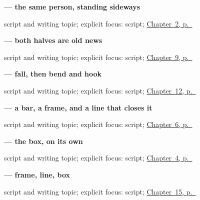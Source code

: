 \noindent\begin{minipage}[t]{\linewidth}
\raggedright
\textbf{ — the same person, standing sideways}\par
\footnotesize script and writing topic; explicit focus: script; \hyperref[ch:zh-components]{Chapter~2, p.~\pageref*{ch:zh-components}}
\end{minipage}\par\smallskip

\noindent\begin{minipage}[t]{\linewidth}
\raggedright
\textbf{ — both halves are old news}\par
\footnotesize script and writing topic; explicit focus: script; \hyperref[ch:zh-shenme]{Chapter~9, p.~\pageref*{ch:zh-shenme}}
\end{minipage}\par\smallskip

\noindent\begin{minipage}[t]{\linewidth}
\raggedright
\textbf{ — fall, then bend and hook}\par
\footnotesize script and writing topic; explicit focus: script; \hyperref[ch:zh-family-six]{Chapter~12, p.~\pageref*{ch:zh-family-six}}
\end{minipage}\par\smallskip

\noindent\begin{minipage}[t]{\linewidth}
\raggedright
\textbf{ — a bar, a frame, and a line that closes it}\par
\footnotesize script and writing topic; explicit focus: script; \hyperref[ch:zh-zaijian]{Chapter~6, p.~\pageref*{ch:zh-zaijian}}
\end{minipage}\par\smallskip

\noindent\begin{minipage}[t]{\linewidth}
\raggedright
\textbf{ — the box, on its own}\par
\footnotesize script and writing topic; explicit focus: script; \hyperref[ch:zh-negation]{Chapter~4, p.~\pageref*{ch:zh-negation}}
\end{minipage}\par\smallskip

\noindent\begin{minipage}[t]{\linewidth}
\raggedright
\textbf{ — frame, line, box}\par
\footnotesize script and writing topic; explicit focus: script; \hyperref[ch:zh-school-compounds]{Chapter~15, p.~\pageref*{ch:zh-school-compounds}}
\end{minipage}\par\smallskip

